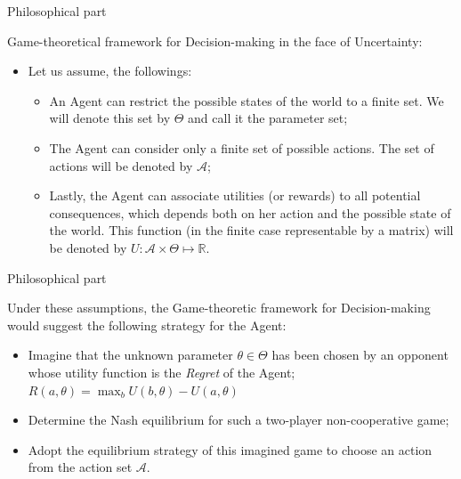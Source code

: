 \documentclass{beamer}
\theoremstyle{definition}
\begin{document}
\begin{frame}{Philosophical part}

Game-theoretical framework for Decision-making in the face of Uncertainty:

\begin{itemize}
    \item Let us assume, the followings:
    \begin{itemize}
    \item An Agent can restrict the possible states of the world to a finite set. We will denote this set by $\Theta$ and call it the parameter set;
    \item The Agent can consider only a finite set of possible actions. The set of actions will be denoted by $\mathcal{A}$;
    \item Lastly, the Agent can associate utilities (or rewards) to all potential consequences, which depends both on her action and the possible state of the world. This function (in the finite case representable by a matrix) will be denoted by $U: \mathcal{A} \times \Theta \mapsto \mathbb{R}$.
\end{itemize}
\end{itemize}

\end{frame}



\begin{frame}{Philosophical part}

Under these assumptions, the Game-theoretic framework for Decision-making would suggest the following strategy for the Agent:

\begin{itemize}
    \item Imagine that the unknown parameter $\theta \in \Theta$ has been chosen by an opponent whose utility function is the \emph{Regret} of the Agent; $R(a,\theta) = \max_{b} U(b,\theta)-U(a,\theta)$
    \item Determine the Nash equilibrium for such a two-player non-cooperative game;
    \item Adopt the equilibrium strategy of this imagined game to choose an action from the action set $\mathcal{A}$.
\end{itemize}

\end{frame}
\end{document}
